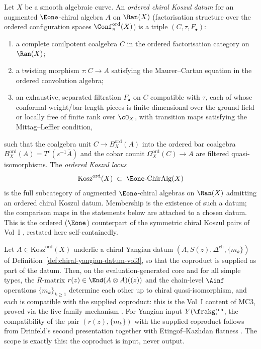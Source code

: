 \begin{definition}
\label{def:kosz-ord-vol3}
Let $X$ be a smooth algebraic curve. An \emph{ordered chiral
Koszul datum} for an augmented $\Eone$-chiral algebra $A$ on
$\Ran(X)$ (factorisation structure over the ordered configuration
spaces $\Conf^{\mathrm{ord}}_n(X)$) is a triple
$(C, \tau, F_\bullet)$:
\begin{enumerate}[label=(\roman*)]
 \item a complete conilpotent coalgebra $C$ in the ordered
 factorisation category on $\Ran(X)$;
 \item a twisting morphism $\tau \colon C \to A$ satisfying the
 Maurer--Cartan equation in the ordered convolution algebra;
 \item an exhaustive, separated filtration $F_\bullet$ on $C$
 compatible with $\tau$, each of whose conformal-weight/bar-length
 pieces is finite-dimensional over the ground field or locally
 free of finite rank over $\cO_X$, with transition maps
 satisfying the Mittag--Leffler condition,
\end{enumerate}
such that the coalgebra unit $C \to B^{\mathrm{ord}}_X(A)$ into
the ordered bar coalgebra
$B^{\mathrm{ord}}_X(A) = T^c(s^{-1}\bar{A})$ and the cobar counit
$\Omega^{\mathrm{ord}}_X(C) \to A$ are filtered
quasi-isomorphisms. The \emph{ordered Koszul locus}
\[
\mathrm{Kosz}^{\mathrm{ord}}(X)
\;\subset\;
\Eone\text{-}\mathrm{ChirAlg}(X)
\]
is the full subcategory of augmented $\Eone$-chiral algebras on
$\Ran(X)$ admitting an ordered chiral Koszul datum. Membership is
the existence of such a datum; the comparison maps in the
statements below are attached to a chosen datum. This is the
ordered ($\Eone$) counterpart of the symmetric chiral Koszul
pairs of Vol~I \cite{VolI}, restated here self-containedly.
\end{definition}

\begin{theorem}
\label{thm:chiral-qg-equiv-datum-vol3}
Let $A \in \mathrm{Kosz}^{\mathrm{ord}}(X)$ underlie a chiral
Yangian datum $(A, S(z), \Delta^{\mathrm{ch}}, \{m_k\})$ of
Definition~\ref{def:chiral-yangian-datum-vol3}, so that the
coproduct is supplied as part of the datum. Then, on the
evaluation-generated core and for all simple types, the
$R$-matrix $r(z) \in \End(A \otimes A)((z))$ and the chain-level
$\Ainf$ operations $\{m_k\}_{k \geq 1}$ determine each other up
to chiral quasi-isomorphism, and each is compatible with the
supplied coproduct: this is the Vol~I content of MC3, proved via
the five-family mechanism \cite{VolI}. For Yangian input
$Y(\frakg)^{\mathrm{ch}}$, the compatibility of the pair
$(r(z), \{m_k\})$ with the supplied coproduct follows from
Drinfeld's second presentation together with Etingof--Kazhdan
flatness \cite{VolI}. The scope is exactly this: the coproduct is
input, never output.
\end{theorem}

